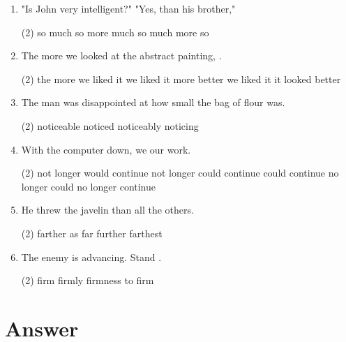 \begin{enumerate}
\item "Is John very intelligent?" "Yes, \ttu than his brother,"
  \begin{tasks}(2)
    \task so much
    \task so more
    \task much so
    \task much more so
  \end{tasks}

\item The more we looked at the abstract painting, \ttu.
  \begin{tasks}(2)
    \task the more we liked it
    \task we liked it more
    \task better we liked it
    \task it looked better
  \end{tasks}

\item The man was \ttu disappointed at how small the bag of flour was.
  \begin{tasks}(2)
    \task noticeable
    \task noticed
    \task noticeably
    \task noticing
  \end{tasks}

\item With the computer down, we \ttu our work.
  \begin{tasks}(2)
    \task not longer would continue
    \task not longer could continue
    \task could continue no longer
    \task could no longer continue
  \end{tasks}

\item He threw the javelin \ttu than all the others.
  \begin{tasks}(2)
    \task farther
    \task as far
    \task further
    \task farthest
  \end{tasks}

\item The enemy is advancing. Stand \ttu.
  \begin{tasks}(2)
    \task firm
    \task firmly
    \task firmness
    \task to firm
  \end{tasks}

\end{enumerate}

\section{Answer}

